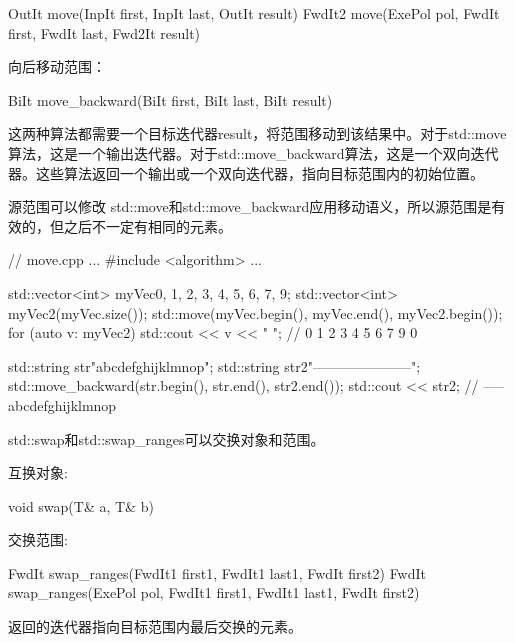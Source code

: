 \begin{cpp}
OutIt move(InpIt first, InpIt last, OutIt result)
FwdIt2 move(ExePol pol, FwdIt first, FwdIt last, Fwd2It result)
\end{cpp}

向后移动范围：

\begin{cpp}
BiIt move_backward(BiIt first, BiIt last, BiIt result)
\end{cpp}

这两种算法都需要一个目标迭代器result，将范围移动到该结果中。对于std::move算法，这是一个输出迭代器。对于std::move\_backward算法，这是一个双向迭代器。这些算法返回一个输出或一个双向迭代器，指向目标范围内的初始位置。

\begin{myWarning}{源范围可以修改}	
std::move和std::move\_backward应用移动语义，所以源范围是有效的，但之后不一定有相同的元素。
\end{myWarning}


\begin{cpp}
// move.cpp
...
#include <algorithm>
...

std::vector<int> myVec{0, 1, 2, 3, 4, 5, 6, 7, 9};
std::vector<int> myVec2(myVec.size());
std::move(myVec.begin(), myVec.end(), myVec2.begin());
for (auto v: myVec2) std::cout << v << " "; // 0 1 2 3 4 5 6 7 9 0

std::string str{"abcdefghijklmnop"};
std::string str2{"---------------------"};
std::move_backward(str.begin(), str.end(), str2.end());
std::cout << str2; // -----abcdefghijklmnop
\end{cpp}


std::swap和std::swap\_ranges可以交换对象和范围。

互换对象:

\begin{cpp}
void swap(T& a, T& b)
\end{cpp}

交换范围:

\begin{cpp}
FwdIt swap_ranges(FwdIt1 first1, FwdIt1 last1, FwdIt first2)
FwdIt swap_ranges(ExePol pol, FwdIt1 first1, FwdIt1 last1, FwdIt first2)
\end{cpp}

返回的迭代器指向目标范围内最后交换的元素。

